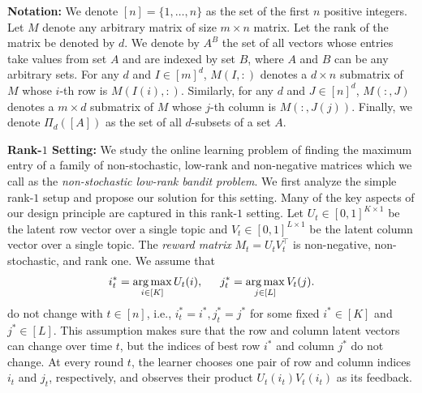 
\newcommand{\transpose}{^\mathsf{\scriptscriptstyle T}}
\textbf{Notation:} We denote $[n] = \{1, \dots, n\}$ as the set of the first $n$ positive integers. Let $M$ denote any arbitrary matrix of size $m \times n$ matrix. Let the rank of the matrix be denoted by $d$. We denote by $A^B$ the set of all vectors whose entries take values from set $A$ and are indexed by set $B$, where $A$ and $B$ can be any arbitrary sets. For any $d$ and $I \in [m]^d$, $M(I, :)$ denotes a $d \times n$ submatrix of $M$ whose $i$-th row is $M(I(i), :)$. Similarly, for any $d$ and $J \in [n]^d$, $M(:, J)$ denotes a $m \times d$ submatrix of $M$ whose $j$-th column is $M(:, J(j))$. Finally, we denote $\Pi_d([A])$ as the set of all $d$-subsets of a set $A$. 

\textbf{Rank-$1$ Setting:} We study the online learning problem of finding the maximum entry of a family of non-stochastic, low-rank and non-negative matrices  which we call as the \emph{non-stochastic low-rank bandit problem}. We first analyze the simple rank-$1$ setup and propose our solution for this setting. Many of the key aspects of our design principle are captured in this rank-$1$ setting. Let $U_t\in [0,1]^{K\times 1}$ be the latent row vector over a single topic and $V_t \in [0,1]^{L\times 1}$ be the latent column vector over a single topic. The \emph{reward matrix} $M_t = U_tV_t^{\intercal}$ is non-negative, non-stochastic, and rank one. We assume that
\begin{align}
  i^\ast_t = \mathop{\rm arg\,max}_{i \in [K]} U_t(i), \hspace{1.5em}
  j^\ast_t = \mathop{\rm arg\,max}_{j \in [L]} V_t(j) \label{eq:rank1ij}.
\end{align}
do not change with $t \in [n]$, i.e., $ i^\ast_t  = i^\ast, j^\ast_t = j^\ast$ for some fixed $i^\ast \in [K]$ and $j^\ast \in [L]$. This assumption makes sure that the row and column latent vectors can change over time $t$, but the indices of best row $i^*$ and column $j^*$ do not change. At every round $t$, the learner chooses one pair of row and column indices $i_t$ and $j_t$, respectively, and observes their product $U_t(i_t)V_t(i_t)$ as its feedback.

